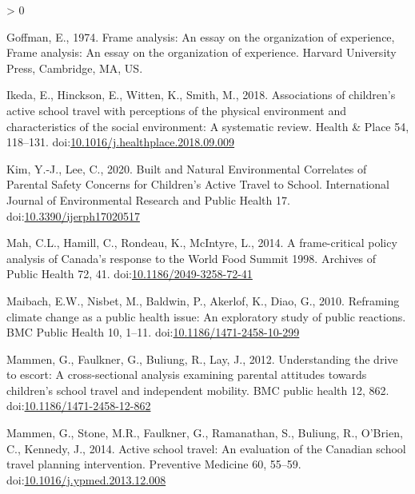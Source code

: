 \documentclass[]{elsarticle} %
\newlength{\cslhangindent}
\newenvironment{CSLReferences}[2] %
 {%
  \setlength{\parindent}{0pt}
  \ifodd #1 \everypar{\setlength{\hangindent}{\cslhangindent}}\ignorespaces\fi
  \ifnum #2 > 0
  \setlength{\parskip}{#2\baselineskip}
  \fi
 }%
 {}
\begin{document}
\begin{CSLReferences}{1}{0}
\leavevmode\hypertarget{ref-goffmanFrameAnalysisEssay1974}{}%
Goffman, E., 1974. Frame analysis: An essay on the organization of
experience, Frame analysis: An essay on the organization of experience.
{Harvard University Press}, {Cambridge, MA, US}.

\leavevmode\hypertarget{ref-ikedaAssociationsChildrenActive2018}{}%
Ikeda, E., Hinckson, E., Witten, K., Smith, M., 2018. Associations of
children's active school travel with perceptions of the physical
environment and characteristics of the social environment: A systematic
review. Health \& Place 54, 118--131.
doi:\href{https://doi.org/10.1016/j.healthplace.2018.09.009}{10.1016/j.healthplace.2018.09.009}

\leavevmode\hypertarget{ref-kimBuiltNaturalEnvironmental2020}{}%
Kim, Y.-J., Lee, C., 2020. Built and {Natural Environmental Correlates}
of {Parental Safety Concerns} for {Children}'s {Active Travel} to
{School}. International Journal of Environmental Research and Public
Health 17.
doi:\href{https://doi.org/10.3390/ijerph17020517}{10.3390/ijerph17020517}

\leavevmode\hypertarget{ref-mahFramecriticalPolicyAnalysis2014}{}%
Mah, C.L., Hamill, C., Rondeau, K., McIntyre, L., 2014. A frame-critical
policy analysis of {Canada}'s response to the {World Food Summit}
1998{}. Archives of Public Health 72, 41.
doi:\href{https://doi.org/10.1186/2049-3258-72-41}{10.1186/2049-3258-72-41}

\leavevmode\hypertarget{ref-maibachReframingClimateChange2010}{}%
Maibach, E.W., Nisbet, M., Baldwin, P., Akerlof, K., Diao, G., 2010.
Reframing climate change as a public health issue: An exploratory study
of public reactions. BMC Public Health 10, 1--11.
doi:\href{https://doi.org/10.1186/1471-2458-10-299}{10.1186/1471-2458-10-299}

\leavevmode\hypertarget{ref-mammenUnderstandingDriveEscort2012}{}%
Mammen, G., Faulkner, G., Buliung, R., Lay, J., 2012. Understanding the
drive to escort: A cross-sectional analysis examining parental attitudes
towards children's school travel and independent mobility. BMC public
health 12, 862.
doi:\href{https://doi.org/10.1186/1471-2458-12-862}{10.1186/1471-2458-12-862}

\leavevmode\hypertarget{ref-mammenActiveSchoolTravel2014}{}%
Mammen, G., Stone, M.R., Faulkner, G., Ramanathan, S., Buliung, R.,
O'Brien, C., Kennedy, J., 2014. Active school travel: An evaluation of
the {Canadian} school travel planning intervention. Preventive Medicine
60, 55--59.
doi:\href{https://doi.org/10.1016/j.ypmed.2013.12.008}{10.1016/j.ypmed.2013.12.008}


\end{CSLReferences}
\end{document}
